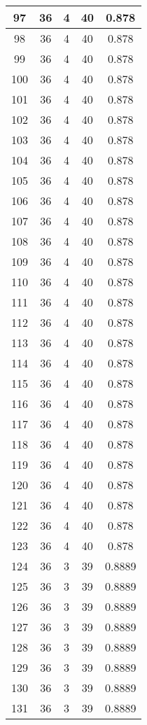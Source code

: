 \documentclass[letterpaper, 12pt]{article}
\begin{document}
\begin{longtable}{|c|c|c|c|c|}
\hline
97 & 36 & 4 & 40 & 0.878 \\
\hline
98 & 36 & 4 & 40 & 0.878 \\
\hline
99 & 36 & 4 & 40 & 0.878 \\
\hline
100 & 36 & 4 & 40 & 0.878 \\
\hline
101 & 36 & 4 & 40 & 0.878 \\
\hline
102 & 36 & 4 & 40 & 0.878 \\
\hline
103 & 36 & 4 & 40 & 0.878 \\
\hline
104 & 36 & 4 & 40 & 0.878 \\
\hline
105 & 36 & 4 & 40 & 0.878 \\
\hline
106 & 36 & 4 & 40 & 0.878 \\
\hline
107 & 36 & 4 & 40 & 0.878 \\
\hline
108 & 36 & 4 & 40 & 0.878 \\
\hline
109 & 36 & 4 & 40 & 0.878 \\
\hline
110 & 36 & 4 & 40 & 0.878 \\
\hline
111 & 36 & 4 & 40 & 0.878 \\
\hline
112 & 36 & 4 & 40 & 0.878 \\
\hline
113 & 36 & 4 & 40 & 0.878 \\
\hline
114 & 36 & 4 & 40 & 0.878 \\
\hline
115 & 36 & 4 & 40 & 0.878 \\
\hline
116 & 36 & 4 & 40 & 0.878 \\
\hline
117 & 36 & 4 & 40 & 0.878 \\
\hline
118 & 36 & 4 & 40 & 0.878 \\
\hline
119 & 36 & 4 & 40 & 0.878 \\
\hline
120 & 36 & 4 & 40 & 0.878 \\
\hline
121 & 36 & 4 & 40 & 0.878 \\
\hline
122 & 36 & 4 & 40 & 0.878 \\
\hline
123 & 36 & 4 & 40 & 0.878 \\
\hline
124 & 36 & 3 & 39 & 0.8889 \\
\hline
125 & 36 & 3 & 39 & 0.8889 \\
\hline
126 & 36 & 3 & 39 & 0.8889 \\
\hline
127 & 36 & 3 & 39 & 0.8889 \\
\hline
128 & 36 & 3 & 39 & 0.8889 \\
\hline
129 & 36 & 3 & 39 & 0.8889 \\
\hline
130 & 36 & 3 & 39 & 0.8889 \\
\hline
131 & 36 & 3 & 39 & 0.8889 \\

\end{longtable}
\end{document}
